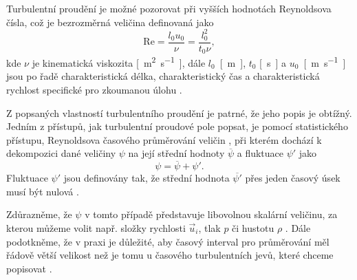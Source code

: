 Turbulentní proudění je možné pozorovat při vyšších hodnotách Reynoldsova čísla, což je bezrozměrná veličina definovaná jako
\begin{equation}\label{Re}
\mathrm{Re} = \dfrac{l_{0} u_{0}}{\nu} = \dfrac{l^{2}_{0}}{t_{0} \nu},
\end{equation}
kde $ \nu $ je kinematická viskozita \si{[m^2.s^{-1}]}, dále $ l_{0} $~\si{[m]}, $ t_{0} $ \si{[s]} a $ u_{0} $~\si{[m.s^{-1}]} jsou po řadě charakteristická délka, charakteristický čas a charakteristická rychlost specifické pro zkoumanou úlohu \cite{Landau}.

Z popsaných vlastností turbulentního proudění je patrné, že jeho popis je obtížný. Jedním z přístupů, jak turbulentní proudové pole popsat, je pomocí statistického přístupu, Reynoldsova časového průměrování veličin \cite{Sodja2007}, při kterém dochází k dekompozici dané veličiny $ \psi $ na její střední hodnoty $ \overline{\psi} $ a fluktuace $ \psi ' $ jako
\begin{equation}
	\psi = \overline{\psi} + \psi '.
\end{equation}
Fluktuace $ \psi ' $ jsou definovány tak, že střední hodnota $ \overline{\psi '} $ přes jeden časový úsek musí být nulová \cite{Schlichting}.

Zdůrazněme, že $ \psi $ v tomto případě představuje libovolnou skalární veličinu, za kterou můžeme volit např. složky rychlosti $ \vec{u}_i $, tlak $ p $ či hustotu $ \rho $ \cite{Sodja2007}. Dále podotkněme, že v praxi je důležité, aby časový interval pro průměrování
měl řádově větší velikost než je tomu u časového
turbulentních jevů, které chceme popisovat \cite{Sodja2007}.

